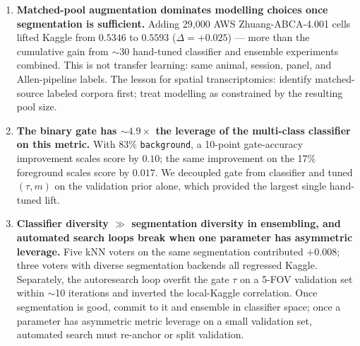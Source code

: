 \documentclass[a4paper,11pt]{article}
\begin{document}
\begin{enumerate}
    \item \textbf{Matched-pool augmentation dominates modelling choices once segmentation is sufficient.} Adding 29{,}000 AWS Zhuang-ABCA-4.001 cells lifted Kaggle from $0.5346$ to $0.5593$ ($\Delta = +0.025$) --- more than the cumulative gain from $\sim$30 hand-tuned classifier and ensemble experiments combined. This is not transfer learning: same animal, session, panel, and Allen-pipeline labels. The lesson for spatial transcriptomics: identify matched-source labeled corpora first; treat modelling as constrained by the resulting pool size.

    \item \textbf{The binary gate has $\sim$$4.9\times$ the leverage of the multi-class classifier on this metric.} With 83\% \texttt{background}, a 10-point gate-accuracy improvement scales score by $0.10$; the same improvement on the 17\% foreground scales score by $0.017$. We decoupled gate from classifier and tuned $(\tau, m)$ on the validation prior alone, which provided the largest single hand-tuned lift.

    \item \textbf{Classifier diversity $\gg$ segmentation diversity in ensembling, and automated search loops break when one parameter has asymmetric leverage.} Five kNN voters on the same segmentation contributed $+0.008$; three voters with diverse segmentation backends all regressed Kaggle. Separately, the autoresearch loop overfit the gate $\tau$ on a 5-FOV validation set within $\sim$10 iterations and inverted the local-Kaggle correlation. Once segmentation is good, commit to it and ensemble in classifier space; once a parameter has asymmetric metric leverage on a small validation set, automated search must re-anchor or split validation.
\end{enumerate}
\end{document}
